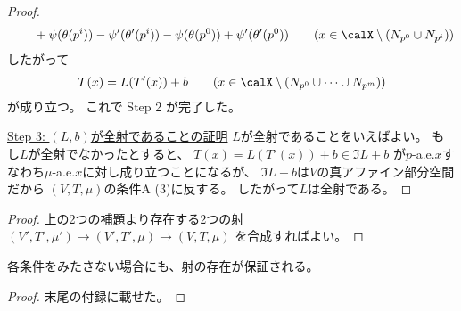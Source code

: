 \documentclass[report]{jlreq}
\begin{document}
\begin{proof}
\begin{equation}
\begin{alignedat}{1}
                &\qquad
                    + \psi(\theta(p^i))
                    - \psi'(\theta'(p^i))
                    - \psi(\theta(p^0))
                    + \psi'(\theta'(p^0))
                    \qquad
                    (x \in \calX \setminus (N_{p^0} \cup N_{p^i}))
        \end{alignedat}
    \end{equation}
    したがって
    \begin{equation}
        T(x) = L(T'(x)) + b
            \qquad
                (x \in \calX \setminus (N_{p^0} \cup \cdots \cup N_{p^m}))
    \end{equation}
    が成り立つ。
    これで Step 2 が完了した。

    \uline{Step 3: $(L, b)$が全射であることの証明} \quad
    $L$が全射であることをいえばよい。
    もし$L$が全射でなかったとすると、
    $T(x) = L(T'(x)) + b \in \Im L + b$
    が$p$-a.e.$x$すなわち$\mu$-a.e.$x$に対し成り立つことになるが、
    $\Im L + b$は$V$の真アファイン部分空間だから
    $(V, T, \mu)$の条件A (3)に反する。
    したがって$L$は全射である。
\end{proof}


\begin{proof}
    上の2つの補題より存在する2つの射
    $(V', T', \mu') \to (V', T', \mu) \to (V, T, \mu)$
    を合成すればよい。
\end{proof}

各条件をみたさない場合にも、射の存在が保証される。


\begin{proof}
    末尾の付録に載せた。
\end{proof}

\end{document}
